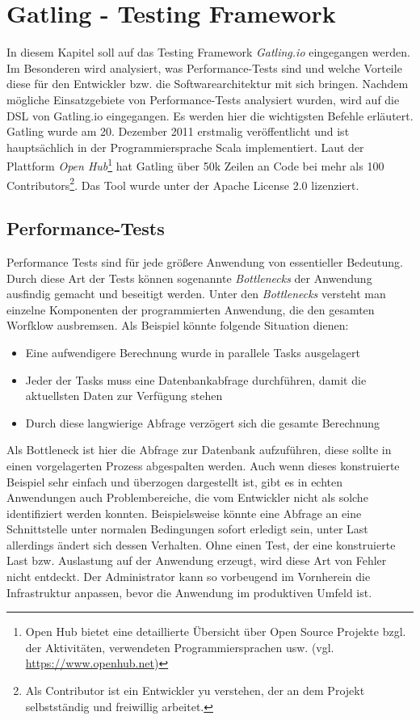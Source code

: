 \chapter{Gatling - Testing Framework}

In diesem Kapitel soll auf das Testing Framework \textit{Gatling.io} eingegangen werden. Im Besonderen wird analysiert, was Performance-Tests sind und welche Vorteile diese für den Entwickler bzw. die Softwarearchitektur mit sich bringen.
\newline
Nachdem mögliche Einsatzgebiete von Performance-Tests analysiert wurden, wird auf die \ac{DSL} von Gatling.io eingegangen. Es werden hier die wichtigsten Befehle erläutert.\\
Gatling wurde am 20. Dezember 2011 erstmalig veröffentlicht und ist hauptsächlich in der Programmiersprache Scala implementiert. Laut der Plattform \textit{Open Hub}\footnote{{} Open Hub bietet eine detaillierte Übersicht über Open Source Projekte bzgl. der Aktivitäten, verwendeten Programmiersprachen usw. (vgl. \url{https://www.openhub.net})} hat Gatling über 50k Zeilen an Code bei mehr als 100 Contributors\footnote{{} Als Contributor ist ein Entwickler yu verstehen, der an dem Projekt selbstständig und freiwillig arbeitet.}.\cite{TheGatli41:online} Das Tool wurde unter der Apache License 2.0 lizenziert.


\section{Performance-Tests}

Performance Tests sind für jede größere Anwendung von essentieller Bedeutung. Durch diese Art der Tests können sogenannte \textit{Bottlenecks} der Anwendung ausfindig gemacht und beseitigt werden. Unter den \textit{Bottlenecks} versteht man einzelne Komponenten der programmierten Anwendung, die den gesamten Worfklow ausbremsen. Als Beispiel könnte folgende Situation dienen:
\begin{itemize}
    \item Eine aufwendigere Berechnung wurde in parallele Tasks ausgelagert
    \item Jeder der Tasks muss eine Datenbankabfrage durchführen, damit die aktuellsten Daten zur Verfügung stehen
    \item Durch diese langwierige Abfrage verzögert sich die gesamte Berechnung
\end{itemize}
Als Bottleneck ist hier die Abfrage zur Datenbank aufzuführen, diese sollte in einen vorgelagerten Prozess abgespalten werden. Auch wenn dieses konstruierte Beispiel sehr einfach und überzogen dargestellt ist, gibt es in echten Anwendungen auch Problembereiche, die vom Entwickler nicht als solche identifiziert werden konnten. Beispielsweise könnte eine Abfrage an eine Schnittstelle unter normalen Bedingungen sofort erledigt sein, unter Last allerdings ändert sich dessen Verhalten. Ohne einen Test, der eine konstruierte Last bzw. Auslastung auf der Anwendung erzeugt, wird diese Art von Fehler nicht entdeckt. Der Administrator kann so vorbeugend im Vornherein die Infrastruktur anpassen, bevor die Anwendung im produktiven Umfeld ist.
 
